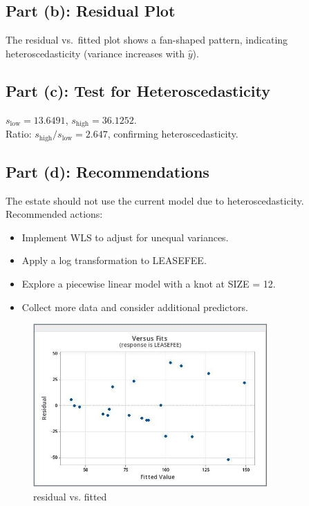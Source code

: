 \documentclass[12pt,notitlepage]{article}
\begin{document}
\subsection*{Part (b): Residual Plot}
The residual vs.\ fitted plot shows a fan-shaped pattern, indicating heteroscedasticity (variance increases with \( \hat{y} \)).

\subsection*{Part (c): Test for Heteroscedasticity}
\( s_{\text{low}} = 13.6491 \), \( s_{\text{high}} = 36.1252 \). \\
Ratio: \( s_{\text{high}} / s_{\text{low}} = 2.647 \), confirming heteroscedasticity.

\subsection*{Part (d): Recommendations}
The estate should not use the current model due to heteroscedasticity. Recommended actions:
\begin{itemize}
    \item Implement WLS to adjust for unequal variances.
    \item Apply a log transformation to LEASEFEE.
    \item Explore a piecewise linear model with a knot at SIZE = 12.
    \item Collect more data and consider additional predictors.
\end{itemize}




\begin{figure}[h]
    \centering
    \includegraphics[width=0.8\textwidth]{Residual_vs_Fitted.jpeg}
    \caption{residual vs. fitted}
\end{figure}
\end{document}
